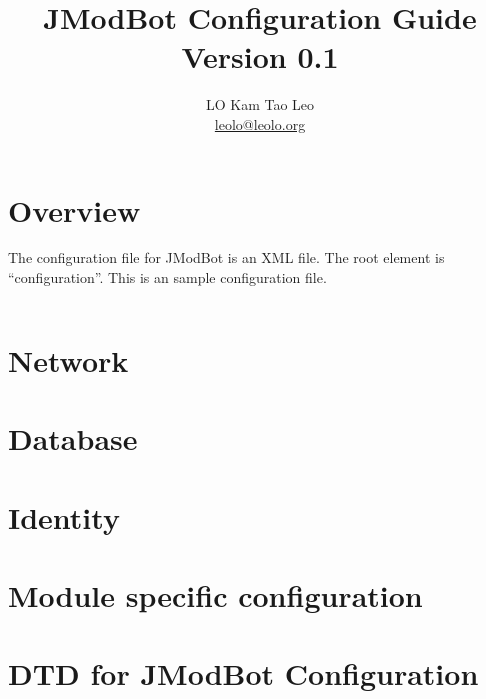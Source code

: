 \documentclass{report}
\title{JModBot Configuration Guide\\Version 0.1}
\author{LO Kam Tao Leo\\\href{mailto:leolo@leolo.org}{leolo@leolo.org}}
\begin{document}
	\maketitle
	\tableofcontents
	\chapter{Overview}
	The configuration file for JModBot is an XML file. The root element is ``configuration''. This is an sample configuration file.
	\inputminted[linenos]{xml}{bot.sample.xml}
	\chapter{Network}
	\chapter{Database}
	\chapter{Identity}
	\chapter{Module specific configuration}
	\chapter{DTD for JModBot Configuration}
	\inputminted[linenos]{dtd}{config.dtd}
\end{document}

